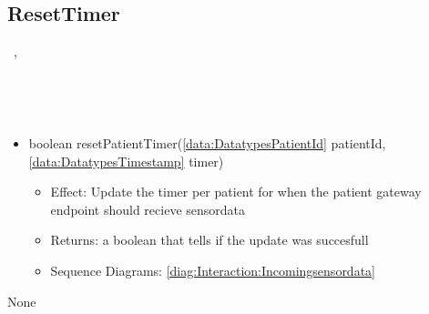   \subsection{ResetTimer}\label{int:InterfacesResetTimer}
    \begin{description}
      \item[Provided by:] \iconcomponent{}~, \iconcomponent{}~
      \item[Required by:] \iconcomponent{}~ 
      \item[Operations:] ~
    \begin{itemize}[noitemsep,nolistsep,leftmargin=-.25cm]
      \item \textsf{boolean resetPatientTimer(\ref{data:DatatypesPatientId} patientId, \ref{data:DatatypesTimestamp} timer)}
        \begin{itemize}[noitemsep,nolistsep]
           \item Effect: Update the timer per patient for when the patient gateway endpoint should recieve sensordata 
           \item Returns: a boolean that tells if the update was succesfull
           \item Sequence Diagrams: \cref{diag:Interaction:Incomingsensordata}
        \end{itemize}
    \end{itemize}
      \item[Diagrams:] None
    \end{description}

